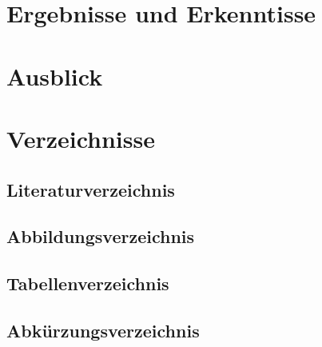 \documentclass[titlepage,12pt,twoside]{article}
\begin{document}
\section{Ergebnisse und Erkenntisse}

\section{Ausblick}

\section{Verzeichnisse}
\subsection{Literaturverzeichnis}

\subsection{Abbildungsverzeichnis}

\subsection{Tabellenverzeichnis}

\subsection{Abkürzungsverzeichnis}

\end{document}
